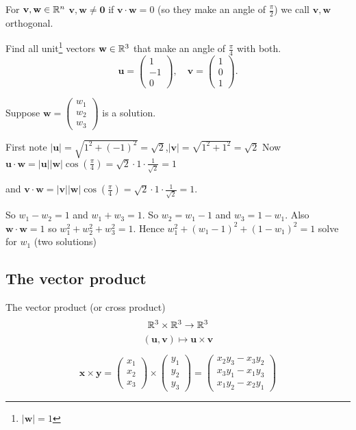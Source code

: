 \documentclass[10pt, a4paper]{article}
\newcommand{\mbf}[1]{\mathbf{#1}}
\begin{document}
For $\mbf{v, w} \in \R ^ n$ $\mbf{v, w \neq 0}$ if $\mbf{v \cdot w} = 0$ (so they make an angle of $\frac{\pi}{2}$) we call $\mbf{v, w}$ orthogonal.

\begin{example}
    Find all unit\footnote{$|\mbf{w}| = 1$} vectors $\mbf{w} \in \R ^ 3$ that make an angle of $\frac{\pi}{4}$ with both.
    \[
    \mbf{u} = \begin{pmatrix} 1 \\ -1 \\ 0 \end{pmatrix},
    \quad\mbf{v} = \begin{pmatrix} 1 \\ 0 \\ 1 \end{pmatrix}.
    \]

    Suppose $\mbf{w} = \begin{pmatrix} w_1 \\ w_2 \\ w_3 \end{pmatrix}$ is a solution.

    First note $|\mbf{u}| = \sqrt{1 ^ 2 + (-1) ^ 2} = \sqrt{2}$,\quad$|\mbf{v}| = \sqrt{1 ^ 2 + 1 ^ 2} = \sqrt{2}$
    Now $\mbf{u \cdot w} = |\mbf{u}||\mbf{w}|\cos\left(\frac{\pi}{4}\right) = \sqrt{2} \cdot 1 \cdot \frac{1}{\sqrt{2}} = 1$

    and $\mbf{v \cdot w} = |\mbf{v}||\mbf{w}|\cos\left(\frac{\pi}{4}\right) = \sqrt{2} \cdot 1 \cdot \frac{1}{\sqrt{2}} = 1$.

    So $w_1 - w_2 = 1$ and $w_1 + w_3 = 1$. So $w_2 = w_1 - 1$ and $w_3 = 1 - w_1$.
    Also $\mbf{w \cdot w} = 1$ so $w_1 ^ 2 + w_2 ^ 2 + w_3 ^ 2 = 1$.
    Hence $w_1 ^ 2 + (w_1 - 1) ^ 2 + (1 - w_1) ^ 2 = 1$
    solve for $w_1$ (two solutions)
\end{example}

\subsection{The vector product}
The vector product (or cross product)
\[
\mathbb{R} ^ 3 \times \mathbb{R} ^ 3 \rightarrow \mathbb{R} ^ 3
\]
\[
(\mbf{u, v}) \mapsto \mbf{u \times v}
\]

\begin{definition}
    \[
    \mbf{x \times y} = \begin{pmatrix}
        x_1 \\ x_2 \\ x_3
    \end{pmatrix}
    \times
    \begin{pmatrix}
        y_1 \\ y_2 \\ y_3
    \end{pmatrix}
    =
    \begin{pmatrix}
        x_2 y_3 - x_3 y_2 \\
        x_3 y_1 - x_1 y_3 \\
        x_1 y_2 - x_2 y_1
    \end{pmatrix}
    \]
\end{definition}
\end{document}
